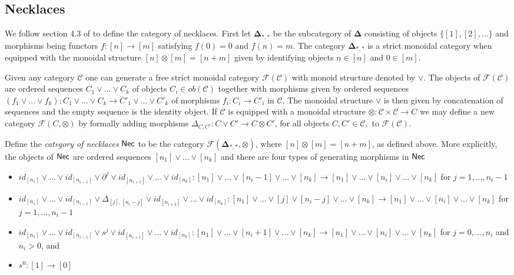 \subsection{Necklaces} We follow section 4.3 of \cite{Imma, Ralph, Andy} to define the category of necklaces. First let $\mathbf{\Delta}_{*,*}$ be the subcategory of $\mathbf{\Delta}$ consisting of objects $\{ [1], [2],\dots\}$ and morphisms being functors $f \colon [n] \to [m]$ satisfying $f(0)=0$ and $f(n)=m$. The category $\mathbf{\Delta}_{*,*}$ is a strict monoidal category when equipped with the monoidal structure $[n] \otimes [m]= [n+m]$ given by identifying objects $n \in [n]$ and $0 \in [m]$.

Given any category $\mathcal{C}$ one can generate a free strict monoidal category $\mathcal{F}(\mathcal{C})$ with monoid structure denoted by $\vee$. The  objects of $\mathcal{F}(\mathcal{C})$ are ordered sequences $C_1 \vee ... \vee C_k$ of objects $C_i \in ob(\mathcal{C})$ together with morphisms given by ordered sequences $(f_1 \vee ... \vee f_k) \colon C_1 \vee ... \vee C_k \to C'_1 \vee ... \vee C'_k$ of morphisms $f_i \colon C_i \to C'_i$ in $\mathcal{C}.$ The monoidal structure $\vee$ is then given by concatenation of sequences and the empty sequence is the identity object. If $\mathcal{C}$ is equipped with a monoidal structure $\otimes \colon \mathcal{C} \times \mathcal{C} \to C$ we may define a new category $\mathcal{F}(C, \otimes)$ by formally adding morphisms $\Delta_{C,C'} \colon C \vee C' \to C \otimes C'$, for all objects $C, C' \in \mathcal{C},$ to $\mathcal{F}(\mathcal{C}).$
 
Define the \textit{category of necklaces} $\mathsf{Nec}$ to be the category  $\mathcal{F}(\mathbf{\Delta}_{*,*}, \otimes)$, where $[n] \otimes [m]=[n+m]$, as defined above. More explicitly, the objects of $\mathsf{Nec}$ are ordered sequences $[n_1] \vee ... \vee[n_k]$ and there are four types of generating morphisms in $\mathsf{Nec}$
\begin{itemize}
\item $id_{[n_1]} \vee ... \vee id_{[n_{i-1}]} \vee \partial^j \vee id_{[n_{i+1}]} \vee ... \vee id_{[n_k]} \colon [n_1] \vee ...\vee [n_i-1] \vee... \vee [n_k] \to [n_1] \vee ...\vee [n_i] \vee ...\vee [n_k]$
for $j=1,\dots,n_i-1$
\item $id_{[n_1]} \vee ... \vee id_{[n_{i-1}]} \vee \Delta_{[j],[n_i-j]} \vee id_{[n_{i+2}]} \vee ... \vee id_{[n_k]} \colon [n_1] \vee ...\vee [j]\vee [n_{i}-j] \vee... \vee [n_k] \to [n_1] \vee ...\vee [n_i] \vee ...\vee [n_k]$ for $j=1,\dots,n_i-1$
\item $id_{[n_1]} \vee ... \vee id_{[n_{i-1}]} \vee s^j \vee id_{[n_{i+1}]} \vee ... \vee id_{[n_k]} \colon [n_1] \vee ...\vee [n_i+1] \vee... \vee [n_k] \to [n_1] \vee ...\vee [n_i] \vee ...\vee [n_k]$ for $j=0,\dots,n_i$ and $n_i>0$, and 
\item $s^0 \colon [1] \to [0]$
\end{itemize}


